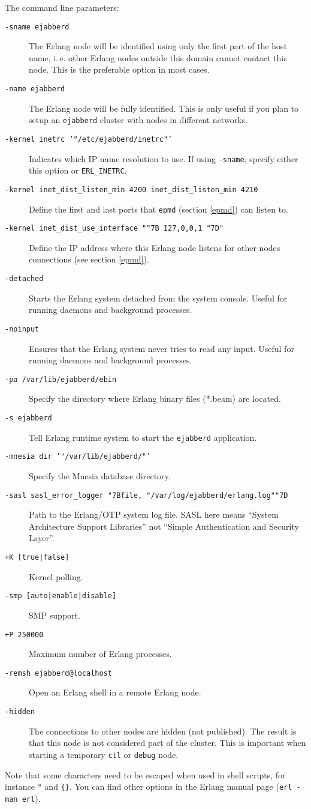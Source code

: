 \documentclass[a4paper,10pt]{book}
\newcommand{\makesection}[2]{ \aname{#1}{} \section{\ahrefloc{#1}{#2}} \label{#1} }
\newcommand{\bracehack}{\def\{{\char"7B}\def\}{\char"7D}}
\newcommand{\titem}[1]{\item[\bracehack\texttt{#1}]}
\newcommand{\term}[1]{\texttt{#1}}
\newcommand{\shell}[1]{\texttt{#1}}
\newcommand{\ejabberd}{\texttt{ejabberd}}
\begin{document}
The command line parameters:
\begin{description}
  \titem{-sname ejabberd}
	The Erlang node will be identified using only the first part
	of the host name, i.\,e. other Erlang nodes outside this domain cannot contact
	this node. This is the preferable option in most cases.
  \titem{-name ejabberd}
	The Erlang node will be fully identified.
    This is only useful if you plan to setup an \ejabberd{} cluster with nodes in different networks.
  \titem{-kernel inetrc '"/etc/ejabberd/inetrc"'}
	Indicates which IP name resolution to use.
	If using \term{-sname}, specify either this option or \term{ERL\_INETRC}.
  \titem{-kernel inet\_dist\_listen\_min 4200 inet\_dist\_listen\_min 4210}
	Define the first and last ports that \term{epmd} (section \ref{epmd}) can listen to.
  \titem{-kernel inet\_dist\_use\_interface "\{ 127,0,0,1 \}"}
	Define the IP address where this Erlang node listens for other nodes
        connections (see section \ref{epmd}).
  \titem{-detached}
        Starts the Erlang system detached from the system console.
	Useful for running daemons and background processes.
  \titem{-noinput}
	Ensures that the Erlang system never tries to read any input.
	Useful for running daemons and background processes.
  \titem{-pa /var/lib/ejabberd/ebin}
	Specify the directory where Erlang binary files (*.beam) are located.
  \titem{-s ejabberd}
	Tell Erlang runtime system to start the \ejabberd{} application.
  \titem{-mnesia dir '"/var/lib/ejabberd/"'}
	Specify the Mnesia database directory.
  \titem{-sasl sasl\_error\_logger \{file, "/var/log/ejabberd/erlang.log"\}}
	Path to the Erlang/OTP system log file.
        SASL here means ``System Architecture Support Libraries''
        not ``Simple Authentication and Security Layer''.
  \titem{+K [true|false]}
	Kernel polling.
  \titem{-smp [auto|enable|disable]}
	SMP support.
  \titem{+P 250000}
	Maximum number of Erlang processes.
  \titem{-remsh ejabberd@localhost}
	Open an Erlang shell in a remote Erlang node.
  \titem{-hidden}
	The connections to other nodes are hidden (not published).
	The result is that this node is not considered part of the cluster.
	This is important when starting a temporary \term{ctl} or \term{debug} node.
\end{description}
Note that some characters need to be escaped when used in shell scripts, for instance \verb|"| and \verb|{}|.
You can find other options in the Erlang manual page (\shell{erl -man erl}).

\makesection{eja-commands}{\ejabberd{} Commands}
\end{document}
